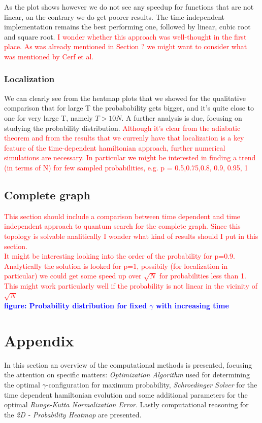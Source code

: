 \documentclass[aps,pra,reprint, onecolumn, showkeys]{revtex4-2}
\newcommand{\red}[1]{\textcolor{red}{#1}}
\newcommand{\blue}[1]{\textcolor{blue}{\textbf{figure: #1}}}
\begin{document}
As the plot shows however we do not see any speedup for functions that are not linear, on the contrary we do get poorer results. The time-independent implementation remains the best performing one, followed by linear, cubic root and square root. \red{I wonder whether this approach was well-thought in the first place. As was already mentioned in Section ? we might want to consider what was mentioned by Cerf et al.}

\subsubsection{Localization}
We can clearly see from the heatmap plots that we showed for the qualitative comparison that for large T the probabability gets bigger, and it's quite close to one for very large T, namely $T>10N$. A further analysis is due, focusing on studying the probability distribution. \red{Although it's clear from the adiabatic theorem and from the results that we currenly have that localization is a key feature of the time-dependent hamiltonian approach, further numerical simulations are necessary. In particular we might be interested in finding a trend (in terms of N) for few sampled probabilities, e.g. p = 0.5,0.75,0.8, 0.9, 0.95, 1  }

\subsection{Complete graph}
\red{This section should include a comparison between time dependent and time independent approach to quantum search for the complete graph. Since this topology is solvable analitically I wonder what kind of results should I put in this section.\\ It might be interesting looking into the order of the probability for p=0.9. Analytically the solution is looked for p=1, possibily (for localization in particular) we could get some speed up over $\sqrt{N}$ for probabilities less than 1. This might work particularly well if the probability is not linear in the vicinity of $\sqrt{N}$ }\\ \blue{Probability distribution for fixed $\gamma$ with increasing time}

\clearpage
\section{Appendix}
In this section an overview of the computational methods is presented, focusing the attention on specific matters: \textit{Optimization Algorithm} used for determining the optimal $\gamma$-configuration for maximum probability, \textit{Schroedinger Solver} for the time dependent hamiltonian evolution and some additional parameters for the optimal \textit{Runge-Kutta Normalization Error}. Lastly computational reasoning for the \textit{2D - Probability Heatmap} are presented. \\
\end{document}
